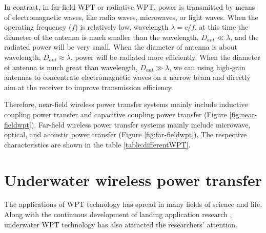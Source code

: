 In contrast, in far-field WPT or radiative WPT, power is transmitted by means of electromagnetic waves, like radio waves, microwaves, or light waves. 
When the operating frequency ($f$) is relatively low, wavelength $\lambda = c/f$, at this time the diameter of the antenna is much smaller than the wavelength, $D_{ant} \ll \lambda$, and the radiated power will be very small. 
When the diameter of antenna is about wavelength, $D_{ant} \approx \lambda$, power will be radiated more efficiently. 
When the diameter of antenna is much great than wavelength, $D_{ant} \gg \lambda$, we can using high-gain antennas to concentrate electromagnetic waves on a narrow beam and directly aim at the receiver to improve transmission efficiency.


Therefore, near-field wireless power transfer systems mainly include inductive coupling power transfer and capacitive coupling power transfer (Figure \ref{fig:near-fieldwpt}). Far-field wireless power transfer systems mainly include microwave, optical, and acoustic power transfer (Figure \ref{fig:far-fieldwpt}). The respective characteristics are shown in the table \ref{table:differentWPT}.


\section{Underwater wireless power transfer}
The applications of WPT technology has spread in many fields of science and life.
Along with the continuous development of landing application research \cite{Zhang2019}, underwater WPT technology has also attracted the researchers' attention. 
